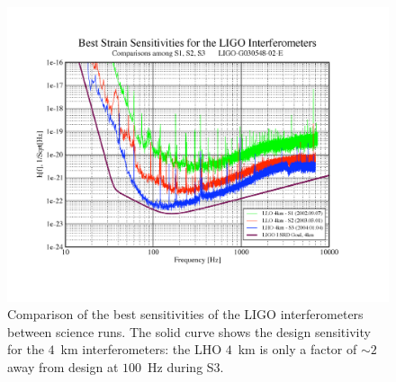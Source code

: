 \newpage 

\begin{figure}[p]
\vspace{5pt}
\begin{center}
\includegraphics[width=\textwidth]{figures/conclusion/s3strain}
\end{center}
\caption[Comparison of Best LIGO Interferometer Sensitivity]{%
\label{f:s3strain}
Comparison of the best sensitivities of the LIGO interferometers between
science runs. The solid curve shows the design sensitivity for the $4$~km
interferometers: the LHO $4$~km is only a factor of $\sim 2$ away from design
at $100$~Hz during S3.
}
\end{figure}

